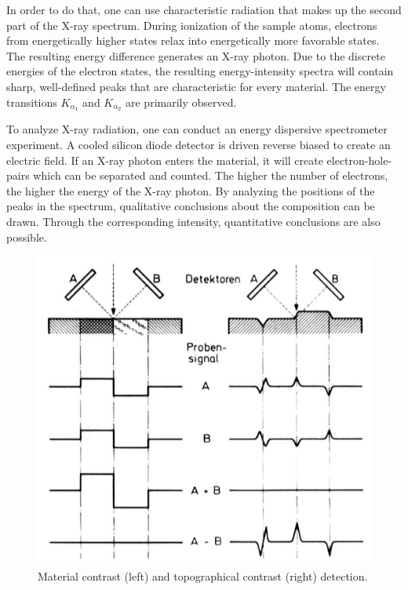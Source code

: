 In order to do that, one can use characteristic radiation that makes up
the second part of the X-ray spectrum.
During ionization of the sample atoms, electrons from energetically
higher states relax into energetically more favorable states.
The resulting energy difference generates an X-ray photon.
Due to the discrete energies of the electron states,
the resulting energy-intensity spectra will contain sharp, well-defined
peaks that are characteristic for every material.
The energy transitions $K_{\mathrm{\alpha}_{1}}$ and
$K_{\mathrm{\alpha}_{2}}$ are primarily observed.

To analyze X-ray radiation, one can conduct an energy dispersive
spectrometer experiment.
A cooled silicon diode detector is driven reverse biased to create an
electric field.
If an X-ray photon enters the material, it will create electron-hole-pairs
which can be separated and counted.
The higher the number of electrons, the higher the energy of the X-ray
photon.
By analyzing the positions of the peaks in the spectrum, qualitative
conclusions about the composition can be drawn.
Through the corresponding intensity, quantitative conclusions are also
possible.

\begin{figure}[h]
	\centering
	\includegraphics[width=0.95\linewidth]{../assets/material.png}
	\caption{Material contrast (left) and topographical contrast (right) detection.
		}
	\label{fig:material_contrast}
\end{figure}
